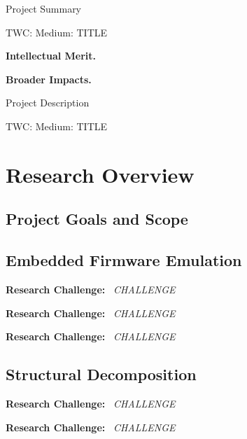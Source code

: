 \documentclass[letterpaper,twoside,11pt,headings=small]{scrartcl}
\newcommand{\thetitle}{TWC: Medium: TITLE\xspace}
\renewcommand{\paragraph}[1]{{\sffamily\textbf{#1}}~}
\newcommand{\challenge}[1]{\paragraph{Research Challenge:} \emph{#1}}
\begin{document}

{\sffamily\bfseries
\begin{center}
\fontsize{16}{16}\selectfont Project Summary

\fontsize{13}{13}\selectfont \thetitle
\end{center}
\label{sec:summary}
}

\paragraph{Intellectual Merit.}

\paragraph{Broader Impacts.}

\newpage
{}
\setcounter{page}{1}

{\sffamily\bfseries
\begin{center}
\fontsize{16}{16}\selectfont Project Description

\fontsize{13}{13}\selectfont \thetitle
\end{center}
\label{sec:summary}
}

\section{Research Overview}
\label{sec:overview}

\subsection{Project Goals and Scope}
\label{sec:overview:goals}

\subsection{Embedded Firmware Emulation}
\label{sec:overview:firmware}

\challenge{CHALLENGE}

\challenge{CHALLENGE}

\challenge{CHALLENGE}

\subsection{Structural Decomposition}
\label{sec:overview:structure}

\challenge{CHALLENGE}

\challenge{CHALLENGE}
\end{document}
